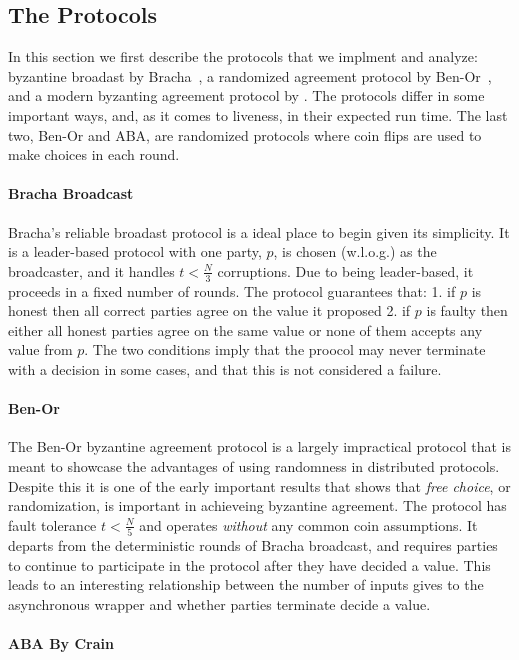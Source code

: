 \subsection{The Protocols}
In this section we first describe the protocols that we implment and analyze: byzantine broadast by Bracha~\cite{bracha}, a randomized agreement protocol by Ben-Or~\cite{Ben-Or}, and a modern byzanting agreement protocol by \cite{who}.
The protocols differ in some important ways, and, as it comes to liveness, in their expected run time.
The last two, Ben-Or and ABA, are randomized protocols where coin flips are used to make choices in each round. 

\paragraph{Bracha Broadcast}
Bracha's reliable broadast protocol is a ideal place to begin given its simplicity.
It is a leader-based protocol with one party, $p$, is chosen (w.l.o.g.) as the broadcaster, and it handles $t < \frac{N}{3}$ corruptions.
Due to being leader-based, it proceeds in a fixed number of rounds.
The protocol guarantees that: 1. if $p$ is honest then all correct parties agree on the value it proposed 2. if $p$ is faulty then either all honest parties agree on the same value or none of them accepts any value from $p$. 
The two conditions imply that the proocol may never terminate with a decision in some cases, and that this is not considered a failure. 

\paragraph{Ben-Or}
The Ben-Or byzantine agreement protocol is a largely impractical protocol that is meant to showcase the advantages of using randomness in distributed protocols.
Despite this it is one of the early important results that shows that \emph{free choice}, or randomization, is important in achieveing byzantine agreement. 
The protocol has fault tolerance $t < \frac{N}{5}$ and operates \emph{without} any common coin assumptions.
It departs from the deterministic rounds of Bracha broadcast, and requires parties to continue to participate in the protocol after they have decided a value. 
This leads to an interesting relationship between the number of inputs \Z gives to the asynchronous wrapper and whether parties terminate decide a value.

\paragraph{ABA By Crain~\cite{crain}}


